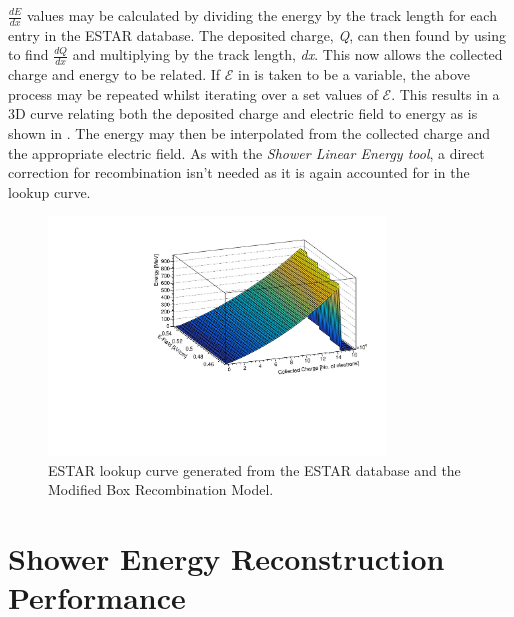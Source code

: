 $\frac{dE}{dx}$ values may be calculated by dividing the energy by the track length for each entry in the ESTAR database. The deposited charge, \textit{Q}, can then found by using  to find $\frac{dQ}{dx}$ and multiplying by the track length, \textit{dx}. This now allows the collected charge and energy to be related. If $\mathcal{E}$ in  is taken to be a variable, the above process may be repeated whilst iterating over a set values of $\mathcal{E}$. This results in a 3D curve relating both the deposited charge and electric field to energy as is shown in . The energy may then be interpolated from the collected charge and the appropriate electric field. As with the \textit{Shower Linear Energy tool}, a direct correction for recombination isn't needed as it is again accounted for in the lookup curve. 

\begin{figure}[h!]
    \centering
    \includegraphics[width = 0.8\textwidth]{figures-chap4/ESTAR_lookup_curve.pdf}
    \caption[ESTAR lookup curve.]{ESTAR lookup curve generated from the ESTAR database and the Modified Box Recombination Model.}
    \label{fig:ESTAR lookup curve}
\end{figure}


\section{Shower Energy Reconstruction Performance}

